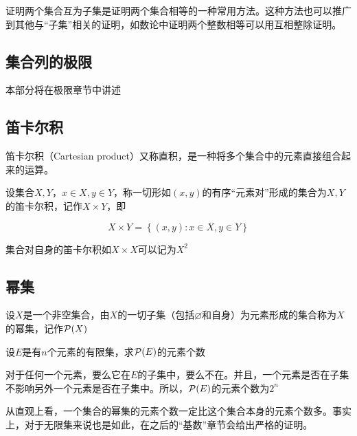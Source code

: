 \begin{remark}
    证明两个集合互为子集是证明两个集合相等的一种常用方法。这种方法也可以推广到其他与“子集”相关的证明，如数论中证明两个整数相等可以用互相整除证明。
\end{remark}

\subsection*{集合列的极限}

本部分将在极限章节中讲述

\subsection{笛卡尔积}

笛卡尔积（Cartesian product）又称直积，是一种将多个集合中的元素直接组合起来的运算。

\begin{definition}
    设集合$X,Y$，$x\in X,y\in Y$，称一切形如$(x,y)$的有序“元素对”形成的集合为$X,Y$的笛卡尔积，记作$X\times Y$，即

    \begin{equation*}
        X\times Y=\left\{(x,y):x\in X,y\in Y \right\}
    \end{equation*}

    集合对自身的笛卡尔积如$X\times X$可以记为$X^2$
\end{definition}

\subsection{幂集}

\begin{definition}
    设$X$是一个非空集合，由$X$的一切子集（包括$\varnothing$和自身）为元素形成的集合称为$X$的幂集，记作$\mathcal{P}(X)$
\end{definition}

\begin{example}
    设$E$是有$n$个元素的有限集，求$\mathcal{P}(E)$的元素个数
\end{example}

对于任何一个元素，要么它在$E$的子集中，要么不在。并且，一个元素是否在子集不影响另外一个元素是否在子集中。所以，$\mathcal{P}(E)$的元素个数为$2^n$

从直观上看，一个集合的幂集的元素个数一定比这个集合本身的元素个数多。事实上，对于无限集来说也是如此，在之后的“基数”章节会给出严格的证明。